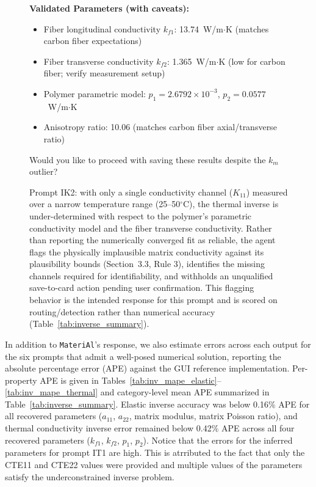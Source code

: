 \documentclass[preprint,review,10pt,number]{elsarticle}
\begin{document}
\begin{figure}[h]
\begin{tcolorbox}
\begin{tcolorbox}
\textbf{Validated Parameters (with caveats):}
\begin{itemize}[leftmargin=1.2em, itemsep=0pt, topsep=2pt]
\item Fiber longitudinal conductivity $k_{f1}$: 13.74~W/m$\cdot$K 
(matches carbon fiber expectations)
\item Fiber transverse conductivity $k_{f2}$: 1.365~W/m$\cdot$K 
(low for carbon fiber; verify measurement setup)
\item Polymer parametric model: $p_1 = 2.6792\times10^{-3}$, $p_2 
= 0.0577$~W/m$\cdot$K
\item Anisotropy ratio: 10.06 (matches carbon fiber axial/transverse 
ratio)
\end{itemize}
\vspace{4pt}
Would you like to proceed with saving these results despite the 
$k_m$ outlier?
\end{tcolorbox}
\end{tcolorbox}
\caption{Prompt IK2: with only a single conductivity channel 
($K_{11}$) measured over a narrow temperature range (25--50$^\circ$C), 
the thermal inverse is under-determined with respect to the 
polymer's parametric conductivity model and the fiber transverse 
conductivity. Rather than reporting the numerically converged fit as 
reliable, the agent flags the physically implausible matrix 
conductivity against its plausibility bounds (Section~3.3, Rule 3), 
identifies the missing channels required for identifiability, and 
withholds an unqualified save-to-card action pending user 
confirmation. This flagging behavior is the intended response for 
this prompt and is scored on routing/detection rather than numerical 
accuracy (Table~\ref{tab:inverse_summary}).}
\label{fig:ik2}
\end{figure}



In addition to \texttt{MateriAl}'s response, we also estimate errors across each output for the six prompts that admit a well-posed numerical solution, reporting the absolute percentage error (APE) against the GUI reference implementation. Per-property APE is given in Tables~\ref{tab:inv_mape_elastic}--\ref{tab:inv_mape_thermal} and category-level mean APE summarized in Table~\ref{tab:inverse_summary}. Elastic inverse accuracy was below 0.16\% APE for all recovered parameters ($a_{11}$, $a_{22}$, matrix modulus, matrix Poisson ratio), and thermal conductivity inverse error remained below 0.42\% APE across all four recovered parameters ($k_{f1}$, $k_{f2}$, $p_1$, $p_2$).
Notice that the errors for the inferred parameters for prompt IT1 are high. 
This is atrributed to the fact that only the CTE11 and CTE22 values were provided and multiple values of the parameters satisfy the underconstrained inverse problem.
\end{document}
